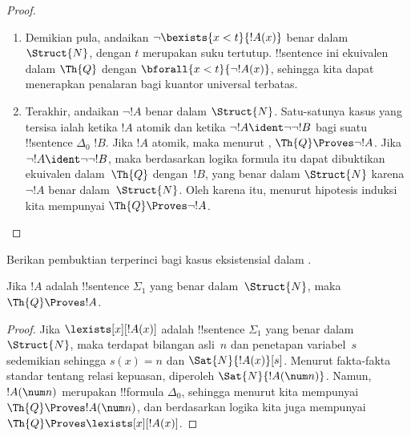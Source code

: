 \documentclass[../../../include/open-logic-section]{subfiles}
\begin{document}
\begin{proof}
\begin{enumerate}
$\Th{Q}$, sehingga kita dapat menerapkan penalaran bagi kuantor eksistensial
terbatas.
%
\item Demikian pula, andaikan $\lnot \bexists{x<t}{!A(x)}$ benar dalam
$\Struct{N}$, dengan $t$ merupakan suku tertutup. !!{sentence} ini ekuivalen
dalam $\Th{Q}$ dengan $\bforall{x<t}{\lnot!A(x)}$, sehingga kita dapat
menerapkan penalaran bagi kuantor universal terbatas.
%
\item Terakhir, andaikan $\lnot !A$ benar dalam $\Struct{N}$. Satu-satunya
kasus yang tersisa ialah ketika $!A$ atomik dan ketika
$\lnot !A \ident \lnot\lnot !B$ bagi suatu !!{sentence} $\Delta_0$ $!B$.
Jika $!A$ atomik, maka menurut ,
$\Th{Q} \Proves \lnot !A$. Jika
$\lnot !A \ident \lnot\lnot !B$, maka berdasarkan logika formula itu dapat
dibuktikan ekuivalen dalam~$\Th{Q}$ dengan~$!B$, yang benar dalam
$\Struct{N}$ karena $\lnot !A$ benar dalam~$\Struct{N}$. Oleh karena itu,
menurut hipotesis induksi kita mempunyai $\Th{Q} \Proves \lnot !A$.
\end{enumerate}
\end{proof}

\begin{prob}
Berikan pembuktian terperinci bagi kasus eksistensial dalam
.
\end{prob}

\begin{thm}
Jika $!A$ adalah !!{sentence} $\Sigma_1$ yang benar dalam~$\Struct{N}$,
maka $\Th{Q} \Proves !A$.
\end{thm}

\begin{proof}
Jika $\lexists[x][!A(x)]$ adalah !!{sentence} $\Sigma_1$ yang benar
dalam~$\Struct{N}$, maka terdapat bilangan asli~$n$ dan penetapan
variabel~$s$ sedemikian sehingga $s(x) = n$ dan $\Sat{N}{!A(x)}[s]$.
Menurut fakta-fakta standar tentang relasi kepuasan, diperoleh
$\Sat{N}{!A(\num n)}$. Namun, $!A(\num n)$ merupakan !!{formula} $\Delta_0$,
sehingga menurut  kita mempunyai
$\Th{Q} \Proves !A(\num n)$, dan berdasarkan logika kita juga mempunyai
$\Th{Q} \Proves \lexists[x][!A(x)]$.
\end{proof}
\end{document}
